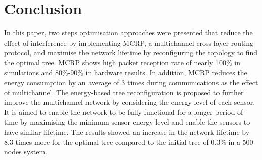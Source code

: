 \section{Conclusion}
\label{Conclusion}

In this paper, two steps optimisation approaches were presented that reduce the effect of interference by implementing MCRP, a multichannel cross-layer routing protocol, and maximise the network lifetime by reconfiguring the topology to find the optimal tree. 
MCRP shows high packet reception rate of nearly 100\% in simulations and 80\%-90\% in hardware results. In addition, MCRP reduces the energy consumption by an average of 3 times during communications as the effect of multichannel.
The energy-based tree reconfiguration is proposed to further improve the multichannel network by considering the energy level of each sensor. 
It is aimed to enable the network to be fully functional for a longer period of time by maximising the minimum sensor energy level and enable the sensors to have similar lifetime.
The results showed an increase in the network lifetime by 8.3 times more for the optimal tree compared to the initial tree of 0.3\% in a 500 nodes system.